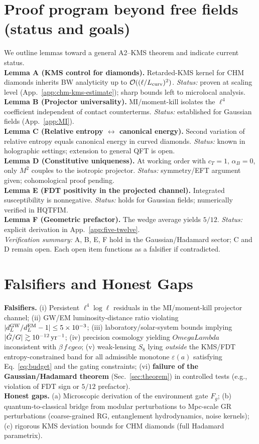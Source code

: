 \documentclass[aps,prd,onecolumn,superscriptaddress,nofootinbib]{revtex4-2}
\def\OmL{OmegaLambda}%
\def\cgeo{cgeo}%
\def\alpha{alpha}%
\def\alpha_M{alphaM}%
\def\Omega_\Lambda{OmegaLambda}%
\providecommand{\OmL}{\Omega_\Lambda}
\providecommand{\cgeo}{c_{\rm geo}}
\begin{document}
\section{Proof program beyond free fields (status and goals)}
\label{sec:program}
We outline lemmas toward a general A2–KMS theorem and indicate current status.\\
\textbf{Lemma A (KMS control for diamonds).} Retarded-KMS kernel for CHM diamonds inherits BW analyticity up to $\mathcal O((\ell/L_{\rm curv})^2)$. \emph{Status:} proven at scaling level (App.~\ref{app:chm-kms-estimate}); sharp bounds left to microlocal analysis.\\
\textbf{Lemma B (Projector universality).} MI/moment-kill isolates the $\ell^4$ coefficient independent of contact counterterms. \emph{Status:} established for Gaussian fields (App.~\ref{app:MI}).\\
\textbf{Lemma C (Relative entropy $\leftrightarrow$ canonical energy).} Second variation of relative entropy equals canonical energy in curved diamonds. \emph{Status:} known in holographic settings; extension to general QFT is open.\\
\textbf{Lemma D (Constitutive uniqueness).} At working order with $c_T=1,\,\alpha_B=0$, only $M^2$ couples to the isotropic projector. \emph{Status:} symmetry/EFT argument given; cohomological proof pending.\\
\textbf{Lemma E (FDT positivity in the projected channel).} Integrated susceptibility is nonnegative. \emph{Status:} holds for Gaussian fields; numerically verified in HQTFIM.\\
\textbf{Lemma F (Geometric prefactor).} The wedge average yields $5/12$. \emph{Status:} explicit derivation in App.~\ref{app:five-twelve}.\\
\emph{Verification summary:} A, B, E, F hold in the Gaussian/Hadamard sector; C and D remain open. Each open item functions as a falsifier if contradicted.

\section{Falsifiers and Honest Gaps}
\label{sec:falsifiers}
\textbf{Falsifiers.} (i) Persistent $\ell^4\log\ell$ residuals in the MI/moment-kill projector channel; (ii) GW/EM luminosity-distance ratio violating $|d_L^{\rm GW}/d_L^{\rm EM}-1|\le 5\times 10^{-3}$; (iii) laboratory/solar-system bounds implying $|\dot G/G|\gtrsim 10^{-12}\,{\rm yr}^{-1}$; (iv) precision cosmology yielding $\OmL$ inconsistent with $\beta\,f\,\cgeo$; (v) weak-lensing $S_8$ lying \emph{outside} the KMS/FDT entropy-constrained band for all admissible monotone $\varepsilon(a)$ satisfying Eq.~\eqref{eq:budget} and the gating constraints; (vi) \textbf{failure of the Gaussian/Hadamard theorem} (Sec.~\ref{sec:theorem}) in controlled tests (e.g., violation of FDT sign or $5/12$ prefactor).\\
\textbf{Honest gaps.} (a) Microscopic derivation of the environment gate $F_g$; (b) quantum-to-classical bridge from modular perturbations to Mpc-scale GR perturbations (coarse-grained RG, entanglement hydrodynamics, noise kernels); (c) rigorous KMS deviation bounds for CHM diamonds (full Hadamard parametrix).
\end{document}
